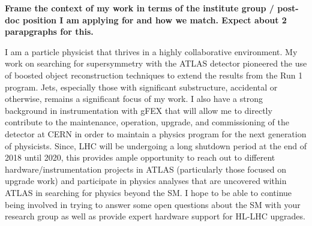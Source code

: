 \documentclass[letterpaper, 10pt]{article}
\begin{document}
\textbf{Frame the context of my work in terms of the institute group / post-doc position I am applying for and how we match. Expect about 2 parapgraphs for this.}

I am a particle physicist that thrives in a highly collaborative environment. My work on searching for supersymmetry with the ATLAS detector pioneered the use of boosted object reconstruction techniques to extend the results from the Run 1 program. Jets, especially those with significant substructure, accidental or otherwise, remains a significant focus of my work. I also have a strong background in instrumentation with gFEX that will allow me to directly contribute to the maintenance, operation, upgrade, and commissioning of the detector at CERN in order to maintain a physics program for the next generation of physicists. Since, LHC will be undergoing a long shutdown period at the end of 2018 until 2020, this provides ample opportunity to reach out to different hardware/instrumentation projects in ATLAS (particularly those focused on upgrade work) and participate in physics analyses that are uncovered within ATLAS in searching for physics beyond the SM. I hope to be able to continue being involved in trying to answer some open questions about the SM with your research group as well as provide expert hardware support for HL-LHC upgrades.

\vspace{0.5cm}

\begin{footnotesize}


\end{footnotesize}
\end{document}
